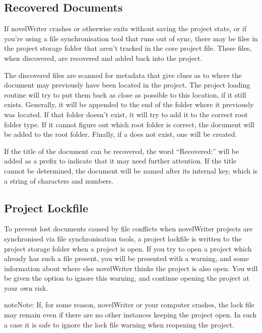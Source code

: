 \documentclass[a4paper,11pt,english]{sphinxmanual}
\begin{document}
\subsection{Recovered Documents}
\label{\detokenize{project_overview:recovered-documents}}\label{\detokenize{project_overview:a-proj-roots-orphaned}}
\sphinxAtStartPar
If novelWriter crashes or otherwise exits without saving the project state, or if you’re using a
file synchronisation tool that runs out of sync, there may be files in the project storage folder
that aren’t tracked in the core project file. These files, when discovered, are recovered and added
back into the project.

\sphinxAtStartPar
The discovered files are scanned for metadata that give clues as to where the document may
previously have been located in the project. The project loading routine will try to put them back
as close as possible to this location, if it still exists. Generally, it will be appended to the
end of the folder where it previously was located. If that folder doesn’t exist, it will try to add
it to the correct root folder type. If it cannot figure out which root folder is correct, the
document will be added to the  root folder. Finally, if a  does not exist, one
will be created.

\sphinxAtStartPar
If the title of the document can be recovered, the word “Recovered:” will be added as a prefix to
indicate that it may need further attention. If the title cannot be determined, the document will
be named after its internal key, which is a string of characters and numbers.


\subsection{Project Lockfile}
\label{\detokenize{project_overview:project-lockfile}}\label{\detokenize{project_overview:a-proj-roots-lock}}
\sphinxAtStartPar
To prevent lost documents caused by file conflicts when novelWriter projects are synchronised via
file synchronisation tools, a project lockfile is written to the project storage folder when a
project is open. If you try to open a project which already has such a file present, you will be
presented with a warning, and some information about where else novelWriter thinks the project is
also open. You will be given the option to ignore this warning, and continue opening the project at
your own risk.

\begin{sphinxadmonition}{note}{Note:}
\sphinxAtStartPar
If, for some reason, novelWriter or your computer crashes, the lock file may remain even if
there are no other instances keeping the project open. In such a case it is safe to ignore the
lock file warning when re\sphinxhyphen{}opening the project.
\end{sphinxadmonition}
\end{document}
